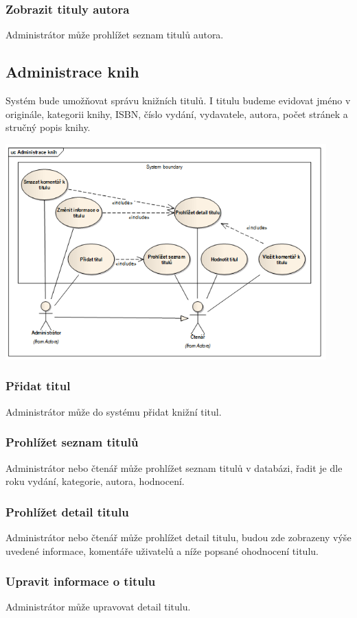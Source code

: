 \documentclass{article}
\begin{document}
\subsubsection{Zobrazit tituly autora}
Administrátor může prohlížet seznam titulů autora.

\subsection{Administrace knih}
Systém bude umožňovat správu knižních titulů. I titulu budeme evidovat jméno v
originále, kategorii knihy, ISBN, číslo vydání, vydavatele, autora, počet
stránek a stručný popis knihy.

\includegraphics[width=350pt]{img/administraceknih.png}
\subsubsection{Přidat titul}
Administrátor může do systému přidat knižní titul.

\subsubsection{Prohlížet seznam titulů}
Administrátor nebo čtenář může prohlížet seznam titulů v databázi, řadit je dle
roku vydání, kategorie, autora, hodnocení.

\subsubsection{Prohlížet detail titulu}
Administrátor nebo čtenář může prohlížet detail titulu, budou zde zobrazeny výše
uvedené informace, komentáře uživatelů a níže popsané ohodnocení titulu.

\subsubsection{Upravit informace o titulu}
Administrátor může upravovat detail titulu.
\end{document}
